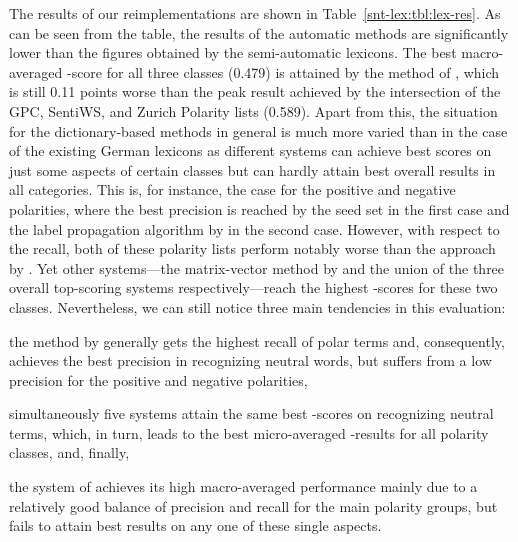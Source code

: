 The results of our reimplementations are shown in
Table~\ref{snt-lex:tbl:lex-res}.  As can be seen from the table, the
results of the automatic methods are significantly lower than the
figures obtained by the semi-automatic lexicons.  The best
macro-averaged \F{}-score for all three classes (0.479) is attained by
the method of \citet{Blair-Goldensohn:08}, which is still 0.11 points
worse than the peak result achieved by the intersection of the GPC,
SentiWS, and Zurich Polarity lists (0.589).  Apart from this, the
situation for the dictionary-based methods in general is much more
varied than in the case of the existing German lexicons as different
systems can achieve best scores on just some aspects of certain
classes but can hardly attain best overall results in all categories.
This is, for instance, the case for the positive and negative
polarities, where the best precision is reached by the seed set in the
first case and the label propagation algorithm by \citet{Rao:09} in
the second case.  However, with respect to the recall, both of these
polarity lists perform notably worse than the approach by
\citet{Esuli:06c}.  Yet other systems---the matrix-vector method by
\citet{Blair-Goldensohn:08} and the union of the three overall
top-scoring systems respectively---reach the highest \F{}-scores for
these two classes.  Nevertheless, we can still notice three main
tendencies in this evaluation:
\begin{inparaenum}
\item the method by \citet{Esuli:06c} generally gets the highest
  recall of polar terms and, consequently, achieves the best precision
  in recognizing neutral words, but suffers from a low precision for
  the positive and negative polarities,
\item simultaneously five systems attain the same best \F{}-scores on
  recognizing neutral terms, which, in turn, leads to the best
  micro-averaged \F{}-results for all polarity classes, and, finally,
\item the system of \citet{Blair-Goldensohn:08} achieves its high
  macro-averaged performance mainly due to a relatively good balance
  of precision and recall for the main polarity groups, but fails to
  attain best results on any one of these single aspects.
\end{inparaenum}



